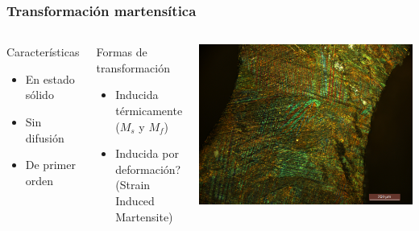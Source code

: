 \documentclass[usenames,dvipsnames]{beamer}
\begin{document}
 \begin{frame}
 \frametitle{Transformación martensítica}

\begin{columns}
 

\begin{block}{Características}
 \begin{itemize}
  \item En estado sólido
  \item Sin difusión
  \item De primer orden
 \end{itemize}
\end{block}
 
\begin{block}{Formas de transformación}
  \begin{itemize}
  \item Inducida térmicamente ($M_s$ y $M_f$)
  \item \alert<1>{Inducida por deformación? (Strain Induced Martensite)}
 \end{itemize}
\end{block}


\includegraphics[width=\columnwidth]{img/intro/EspAMicro1.jpg}

\end{columns}
 
\end{frame}

% 
\end{document}
